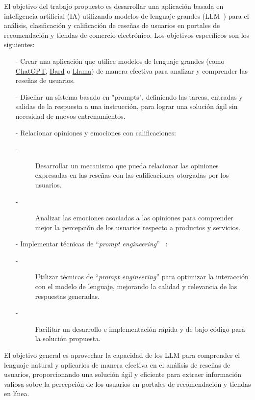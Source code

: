 
El objetivo del trabajo propuesto es desarrollar una aplicación 
basada en inteligencia artificial (IA) utilizando modelos de lenguaje grandes (LLM~\cite{mirchandani2023large}) 
para el análisis, clasificación y calificación de reseñas de usuarios en portales 
de recomendación y tiendas de comercio electrónico. 
Los objetivos específicos son los siguientes:
\begin{itemize}
    \item[-] Crear una aplicación que utilice modelos de lenguaje grandes (como \href{https://chat.openai.com}{ChatGPT}, \href{https://bard.google.com/?hl=es}{Bard} o \href{https://research.facebook.com/publications/llama-open-and-efficient-foundation-language-models}{Llama})
    de manera efectiva para analizar y comprender las reseñas de usuarios. 
    \item[-] Diseñar un sistema basado en "prompts", definiendo las tareas, entradas y 
    salidas de la respuesta a una instrucción, para lograr una solución 
    ágil sin necesidad de nuevos entrenamientos.
    
    \item[-] Relacionar opiniones y emociones con calificaciones:
    \begin{description}
        \item[-] Desarrollar un mecanismo que pueda relacionar las opiniones expresadas 
        en las reseñas con las calificaciones otorgadas por los usuarios.
        \item[-] Analizar las emociones asociadas a las opiniones para comprender 
        mejor la percepción de los usuarios respecto a productos y servicios.
    \end{description}
    \item[-] Implementar técnicas de ``\emph{prompt engineering}'' ~\cite{white2023prompt}:
    \begin{description}
        \item[-] Utilizar técnicas de ``\emph{prompt engineering}'' para optimizar la 
        interacción con el modelo de lenguaje, mejorando la calidad y 
        relevancia de las respuestas generadas.
        \item[-] Facilitar un desarrollo e implementación rápida y de bajo código para la solución propuesta. 
    \end{description}
        
\end{itemize}

El objetivo general es aprovechar la capacidad de los LLM 
para comprender el lenguaje natural y aplicarlos de manera efectiva en el 
análisis de reseñas de usuarios, proporcionando una solución ágil y 
eficiente para extraer información valiosa sobre la 
percepción de los usuarios en portales de recomendación y tiendas en línea.